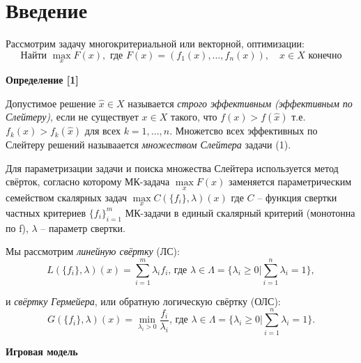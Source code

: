 \section{Введение}
\begin{flushleft}

Рассмотрим задачу многокритериальной или векторной, оптимизации:
\begin{equation}
\textrm{Найти }\max\limits_x F(x), \textrm{ где } F(x)=({f}_1(x),\ldots, {f}_n(x)),\quad x\in X\textrm{ конечно}
\end{equation}


\textbf{Определение [1]} 

Допустимое решение $\hat{x}\in{X}$ называется \textit{строго эффективным (эффективным по Слейтеру)}, если не существует
$x\in{X}$ такого, что $f(x)>f(\hat{x})$ т.е. $f_k(x)>f_k(\hat{x})$ для всех $k=1,...,n$. Множетсво всех эффективных по
Слейтеру решений называается \textit{множеством Слейтера} задачи (1).
\vspace{5mm}

Для параметризации задачи и поиска множества Слейтера используется метод свёрток, согласно которому МК-задача
$\max\limits_x F(x)$ заменяется параметрическим семейством скалярных задач $\max\limits_x C(\{f_i\}, \lambda)(x)$
где $C$ – функция свертки частных критериев $\{f_i\}_{i=1}^m$ МК-задачи в единый скалярный критерий (монотонна по f), 
$\lambda$ – параметр свертки. 
\vspace{5mm}

Мы рассмотрим \textit{линейную свёртку} (ЛС):
\begin{equation}
L(\{f_i\}, \lambda)(x)=\sum_{i=1}^{m} \lambda_i f_i \textrm{, где }
\lambda \in \Lambda =\{\lambda_i \geq 0 | \sum_{i=1}^n \lambda_i =1 \},
\end{equation}

и \textit{свёртку Гермейера}, или обратную логическую свёртку (ОЛС):
\begin{equation}
G(\{f_i\}, \lambda)(x)=\min\limits_{\lambda_i > 0} \frac{f_i}{\lambda_i} \textrm{, где }
\lambda \in \Lambda =\{\lambda_i \geq 0 | \sum_{i=1}^n \lambda_i =1 \}.
\end{equation}

\textbf{Игровая модель}


\end{flushleft}
